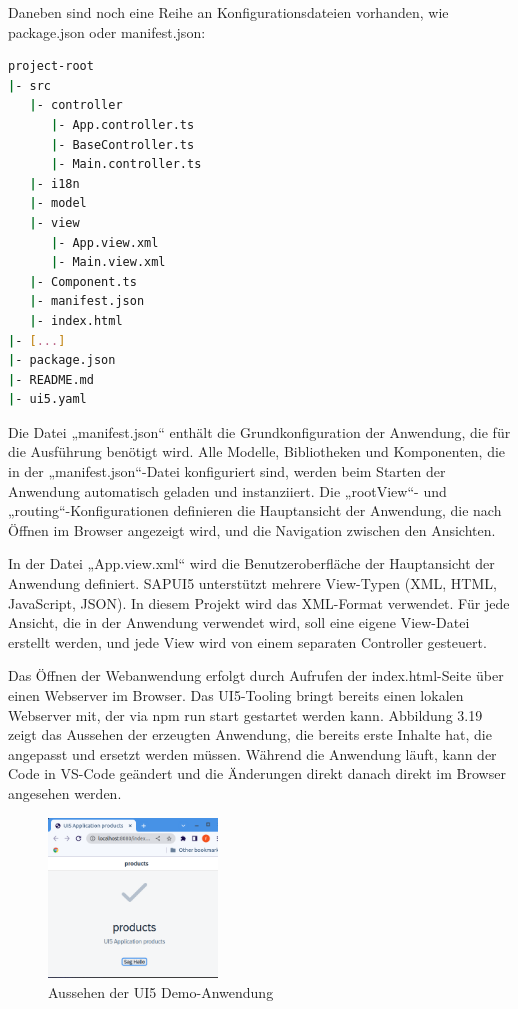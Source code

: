 Daneben sind noch eine Reihe an Konfigurationsdateien vorhanden, wie package.json oder manifest.json: 

\begin{lstlisting}[language=bash]
project-root
|- src
   |- controller
      |- App.controller.ts
      |- BaseController.ts
      |- Main.controller.ts
   |- i18n
   |- model
   |- view
      |- App.view.xml
      |- Main.view.xml
   |- Component.ts
   |- manifest.json
   |- index.html
|- [...]
|- package.json
|- README.md
|- ui5.yaml
\end{lstlisting}

Die Datei „manifest.json“ enthält die Grundkonfiguration der Anwendung, die für die Ausführung benötigt wird. Alle Modelle, Bibliotheken und Komponenten, die in der „manifest.json“-Datei konfiguriert sind, werden beim Starten der Anwendung automatisch geladen und instanziiert. Die „rootView“- und „routing“-Konfigurationen definieren die Hauptansicht der Anwendung, die nach Öffnen im Browser angezeigt wird, und die Navigation zwischen den Ansichten.

In der Datei „App.view.xml“ wird die Benutzeroberfläche der Hauptansicht der Anwendung definiert. SAPUI5 unterstützt mehrere View-Typen (XML, HTML, JavaScript, JSON). In diesem Projekt wird das XML-Format verwendet. Für jede Ansicht, die in der Anwendung verwendet wird, soll eine eigene View-Datei erstellt werden, und jede View wird von einem separaten Controller gesteuert. 

Das Öffnen der Webanwendung erfolgt durch Aufrufen der index.html-Seite   über einen Webserver im Browser.  Das UI5-Tooling bringt bereits einen lokalen Webserver mit, der via npm run start gestartet werden kann.  Abbildung 3.19 zeigt das Aussehen der erzeugten Anwendung, die bereits erste Inhalte hat, die angepasst und ersetzt werden müssen. Während die Anwendung läuft, kann der Code in VS-Code geändert und die Änderungen direkt danach direkt im Browser angesehen werden. 

\begin{figure}[htbp]
 \centering
 \includegraphics[width=0.4\textwidth]{Bilder/ui5 freestyle/3_19_ui5_demo.png}
 \caption{Aussehen der UI5 Demo-Anwendung}
\end{figure}

